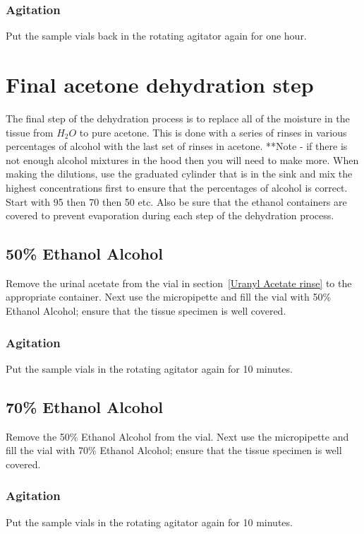 \subsubsection{Agitation}\label{agitation 5 number 4}
Put the sample vials back in the rotating agitator again for one hour.  

\section{Final acetone dehydration step}
The final step of the dehydration process is to replace all of the moisture in
the tissue from $H_2O$ to pure acetone.  This is done with a series of rinses
in various percentages of alcohol with the last set of rinses in acetone.
**Note - if there is not enough alcohol mixtures in the hood then you will need
to make more.  When making the dilutions, use the graduated cylinder that is in
the sink and mix the highest concentrations first to ensure that the
percentages of alcohol is correct.  Start with 95 then 70 then 50 etc.  Also be
sure that the ethanol containers are covered to prevent evaporation during each
step of the dehydration process.

\subsection{50\% Ethanol Alcohol}
Remove the urinal acetate from the vial in section~\ref{Uranyl Acetate rinse}
to the appropriate container.  Next use the micropipette and fill the vial with
50\% Ethanol Alcohol; ensure that the tissue specimen is well covered.

\subsubsection{Agitation}
Put the sample vials in the rotating agitator again for 10 minutes. 

\subsection{70\% Ethanol Alcohol}
Remove the 50\% Ethanol Alcohol from the vial.  Next use the micropipette and
fill the vial with 70\% Ethanol Alcohol; ensure that the tissue specimen is
well covered.

\subsubsection{Agitation}
Put the sample vials in the rotating agitator again for 10 minutes. 

